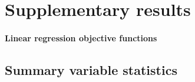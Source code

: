 \section{Supplementary results}
\label{sec:sup-res.}

\paragraph{Linear regression objective functions}
\label{sec:lin-reg}



\subsection{Summary variable statistics}
\label{sec:sum-var-stat}





